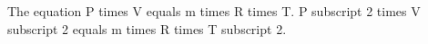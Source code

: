 The equation P times V equals m times R times T. 
P subscript 2 times V subscript 2 equals m times R times T subscript 2.